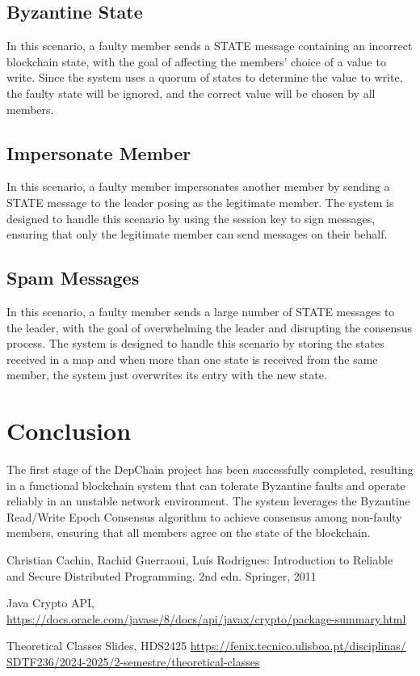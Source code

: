 \documentclass[runningheads]{llncs}
\begin{document}
\subsection{Byzantine State}
In this scenario, a faulty member sends a STATE message containing an incorrect
blockchain state, with the goal of affecting the members' choice of a value to write.
Since the system uses a quorum of states to determine the value to write, the
faulty state will be ignored, and the correct value will be chosen by all members.
%
\subsection{Impersonate Member}
In this scenario, a faulty member impersonates another member by sending a STATE
message to the leader posing as the legitimate member. The system is designed to
handle this scenario by using the session key to sign messages, ensuring that
only the legitimate member can send messages on their behalf.
%
\subsection{Spam Messages}
In this scenario, a faulty member sends a large number of STATE messages to the
leader, with the goal of overwhelming the leader and disrupting the consensus
process. The system is designed to handle this scenario by storing the states
received in a map and when more than one state is received from the same member,
the system just overwrites its entry with the new state.
%
\section{Conclusion}
The first stage of the DepChain project has been successfully completed,
resulting in a functional blockchain system that can tolerate Byzantine faults
and operate reliably in an unstable network environment. The system leverages
the Byzantine Read/Write Epoch Consensus algorithm to achieve consensus among
non-faulty members, ensuring that all members agree on the state of the
blockchain.

\begin{thebibliography}{8}

Christian Cachin, Rachid Guerraoui, Luís Rodrigues: Introduction to Reliable and
Secure Distributed Programming. 2nd edn. Springer, 2011

Java Crypto API,
\url{https://docs.oracle.com/javase/8/docs/api/javax/crypto/package-summary.html}

Theoretical Classes Slides, HDS2425
\url{https://fenix.tecnico.ulisboa.pt/disciplinas/ SDTF236/2024-2025/2-semestre/theoretical-classes}
\end{thebibliography}
\end{document}
